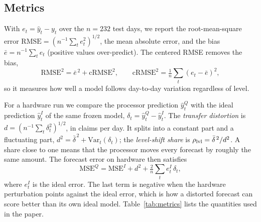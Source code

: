 \documentclass[journal]{IEEEtran}
\newcommand{\RMSE}{\mathrm{RMSE}}
\newcommand{\cRMSE}{\mathrm{cRMSE}}
\begin{document}
\subsection{Metrics}
With $e_t=\hat y_t-y_t$ over the $n=232$ test days, we report the root-mean-square error $\RMSE=(n^{-1}\sum_t e_t^2)^{1/2}$, the mean absolute error, and the bias $\bar e=n^{-1}\sum_t e_t$ (positive values over-predict). The centered RMSE removes the bias,
\begin{equation}
\RMSE^2=\bar e^{\,2}+\cRMSE^2,\qquad \cRMSE^2=\tfrac1n\textstyle\sum_t (e_t-\bar e)^2 ,
\label{eq:crmse}
\end{equation}
so it measures how well a model follows day-to-day variation regardless of level.

For a hardware run we compare the processor prediction $\hat y^Q_t$ with the ideal prediction $\hat y^I_t$ of the same frozen model, $\delta_t=\hat y^Q_t-\hat y^I_t$. The \emph{transfer distortion} is $d=(n^{-1}\sum_t\delta_t^2)^{1/2}$, in claims per day. It splits into a constant part and a fluctuating part, $d^2=\bar\delta^{\,2}+\mathrm{Var}_t(\delta_t)$; the \emph{level-shift share} is $\rho_{\rm lvl}=\bar\delta^{\,2}/d^2$. A share close to one means that the processor moves every forecast by roughly the same amount. The forecast error on hardware then satisfies
\begin{equation}
\mathrm{MSE}^Q=\mathrm{MSE}^I+d^2+\tfrac2n\textstyle\sum_t e^I_t\,\delta_t ,
\label{eq:interaction}
\end{equation}
where $e^I_t$ is the ideal error. The last term is negative when the hardware perturbation points against the ideal error, which is how a distorted forecast can score better than its own ideal model. Table~\ref{tab:metrics} lists the quantities used in the paper.
\end{document}
